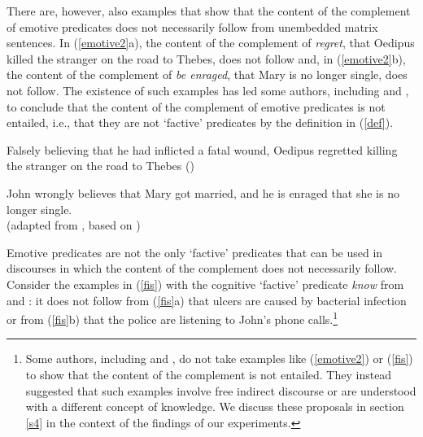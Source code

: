 \documentclass[11pt,fleqn]{article}
\newcommand{\6}{\mbox{$[\hspace*{-.6mm}[$}}
\newcommand{\9}{\mbox{$]\hspace*{-.6mm}]$}}
\begin{document}
There are, however, also examples that show that the content of the complement of emotive predicates does not necessarily follow from unembedded matrix sentences. In (\ref{emotive2}a), the content of the complement of {\em regret}, that Oedipus killed the stranger on the road to Thebes, does not follow and, in (\ref{emotive2}b), the content of the complement of {\em be enraged}, that Mary is no longer single, does not follow. The existence of such examples has led some authors, including \citet{klein1975,giannakidou1998,schlenker2003} and \citet{egre2008}, to conclude that the content of the complement of emotive predicates is not entailed, i.e., that they are not `factive' predicates by the definition in (\ref{def}).

\begin{exe}

\ex\label{emotive2}

\begin{xlist}

\ex Falsely believing that he had inflicted a fatal wound, Oedipus regretted killing the stranger on the road to Thebes \hfill (\citealt{klein1975})

\ex John wrongly believes that Mary got married, and he is enraged that she is no longer single. \\ \hspace*{.2cm} \hfill (adapted from \citealt{egre2008}, based on \citealt{schlenker03})

\end{xlist}

\end{exe}
Emotive predicates are not the only `factive' predicates that can be used in discourses in which the content of the complement does not necessarily follow. Consider the examples in (\ref{fis}) with the cognitive `factive' predicate {\em know} from  \citealt{hazlett2010} and \citealt{abrusan2011}:  it does not follow from (\ref{fis}a) that ulcers are caused by bacterial infection or from (\ref{fis}b) that the police are listening to John's phone calls.\footnote{Some authors, including \citet{gazdar79a} and \citet{abrusan2011}, do not take examples like (\ref{emotive2}) or (\ref{fis}) to show that the content of the complement is not entailed. They instead suggested that such examples involve free indirect discourse or are understood with a different concept of knowledge. We discuss these proposals in section \ref{s4} in the context of the findings of our experiments.}
\end{document}
